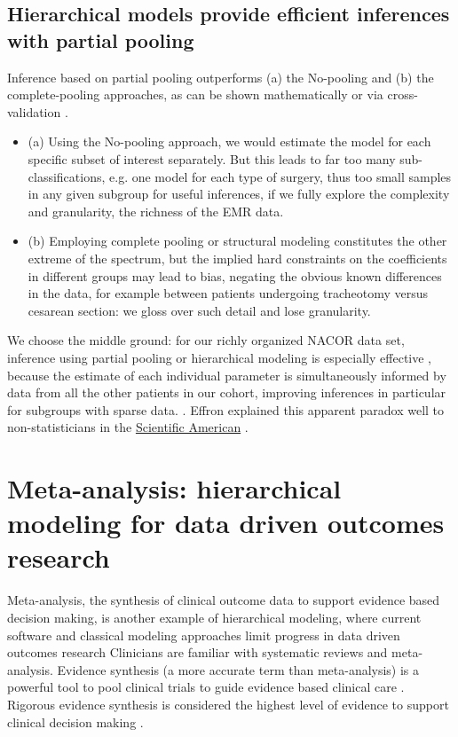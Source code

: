 \documentclass[11pt,notitlepage]{article}
\begin{document}
\subsection*{Hierarchical models provide efficient inferences with partial pooling}
Inference based on partial pooling outperforms (a) the No-pooling and (b) the complete-pooling approaches, as can be shown mathematically \cite{Efron_1975} or via cross-validation \cite{Gelman-Hill_2014}.  

\begin{itemize}

\item (a) Using the No-pooling approach, we would estimate the model for each specific subset of interest separately. But this leads to far too many sub-classifications, e.g. one model for each type of surgery, thus too small samples in any given subgroup for useful inferences, if we fully explore the complexity and granularity, the richness of the EMR data. 
\item (b) Employing complete pooling or structural modeling constitutes the other extreme of the spectrum, but the implied hard constraints on the coefficients in different groups may lead to bias, negating the obvious known differences in the data, for example between patients undergoing tracheotomy versus cesarean section: we gloss over such detail and lose granularity. 
\end{itemize}

We choose the middle ground: for our richly organized NACOR data set, inference using partial pooling or hierarchical modeling is especially effective , because the estimate of each individual parameter is simultaneously informed by data from all the other patients in our cohort, improving inferences in particular for subgroups with sparse data. \cite{Gelman2009}. Effron explained this apparent paradox well to non-statisticians in the \href{http://www.nature.com/scientificamerican/journal/v236/n5/pdf/scientificamerican0577-119.pdf}{Scientific American} \cite{Stein_paradox_Scientific_American}. 

\section*{Meta-analysis: hierarchical modeling for data driven outcomes research}
Meta-analysis, the synthesis of clinical outcome data to support evidence based decision making, is another example of hierarchical modeling, where current software and classical modeling approaches limit progress in data driven outcomes research \cite{Andreae2015} Clinicians are familiar with systematic reviews and meta-analysis\cite{Sackett1996}. Evidence synthesis (a more accurate term than meta-analysis) is a powerful tool to pool clinical trials to guide evidence based clinical care \cite{Ashby2000}. Rigorous evidence synthesis is considered the highest level of evidence to support clinical decision making \cite{Cook1997}. 
\end{document}
